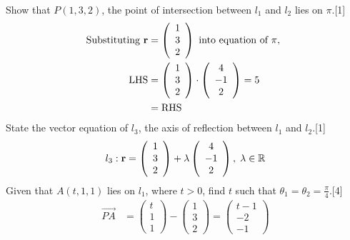 \documentclass[12pt, a4 paper]{article}
\begin{document}
\begin{outline}[enumerate]
\begin{align*}
					\end{align*}
					\color{black}
					\2	Show that $P(1,3,2)$, the point of intersection between ${l_1}$ and ${l_2}$ lies on $\pi $.\hfill[1]
					\color{blue}
					\begin{align*}
						{\textrm{Substituting }}{\bf{r}} & = \left( {\begin{array}{*{20}{c}}1 \\3\\2\end{array}} \right){\textrm{ into equation of }}\pi ,{\textrm{ }}\\{\textrm{LHS}} &= \left( {\begin{array}{*{20}{c}}1\\3\\2\end{array}} \right) \cdot \left( {\begin{array}{*{20}{c}}4\\{ - 1}\\2\end{array}} \right) = 5\\
						&= {\textrm{RHS}}
					\end{align*}
					\color{black}
					\2	State the vector equation of ${l_3}$, the axis of reflection between ${l_1}$ and ${l_2}$.\hfill[1]
					\color{blue}
					\begin{equation*}
						{l_3}:{\bf{r}} = \left( {\begin{array}{*{20}{c}}1 \\3\\2\end{array}} \right) + \lambda \left( {\begin{array}{*{20}{c}}4\\{ - 1}\\2\end{array}} \right),\;\lambda  \in \mathbb{R}
					\end{equation*}
					\color{black}
					\2	Given that $A(t,1,1)$ lies on ${l_1}$, where $t > 0$, find $t$ such that ${\theta _1} = {\theta _2} = \frac{\pi }{4}$.\hfill[4]
					\color{blue}
					\begin{align*}
						\overrightarrow {PA} & = \left( {\begin{array}{*{20}{c}}t \\1\\1\end{array}} \right) - \left( {\begin{array}{*{20}{c}}1\\3\\2\end{array}} \right) = \left( {\begin{array}{*{20}{c}}{t - 1}\\{ - 2}\\{ - 1}\end{array}} \right)

\end{align*}
\end{outline}
\end{document}
